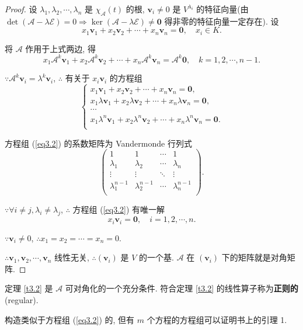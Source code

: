 \documentclass{ctexart}
\begin{document}
\begin{proof}
    设 $\lambda_1,\lambda_2,\cdots,\lambda_n$ 是 $\chi_{\mathcal{A}}(t)$ 的根, $\boldsymbol{v}_i\neq0$ 是 $V^{\lambda_i}$ 的特征向量(由 $\det(\mathcal{A}-\lambda\mathcal{E})=0\Rightarrow\ker(\mathcal{A}-\lambda\mathcal{E})\neq\boldsymbol{0}$ 得非零的特征向量一定存在). 设
    \[x_1\boldsymbol{v}_1+x_2\boldsymbol{v}_2+\cdots+x_n\boldsymbol{v}_n=\boldsymbol{0},\quad x_i\in K.\]
    
    将 $\mathcal{A}$ 作用于上式两边, 得
    \[x_1\mathcal{A}^k\boldsymbol{v}_1+x_2\mathcal{A}^k\boldsymbol{v}_2+\cdots+x_n\mathcal{A}^k\boldsymbol{v}_n=\mathcal{A}^k\boldsymbol{0},\quad k=1,2,\cdots,n-1.\]

    $\because\mathcal{A}^k\boldsymbol{v}_i=\lambda^k\boldsymbol{v}_i$, $\therefore$ 有关于 $x_i\boldsymbol{v}_i$ 的方程组
    \begin{equation}\label{eq3.2}
        \begin{cases}
            x_1\boldsymbol{v}_1+x_2\boldsymbol{v}_2+\cdots+x_n\boldsymbol{v}_n=\boldsymbol{0}, \\
            x_1\lambda\boldsymbol{v}_1+x_2\lambda\boldsymbol{v}_2+\cdots+x_n\lambda\boldsymbol{v}_n=\boldsymbol{0}, \\
            \cdots \\
            x_1\lambda^n\boldsymbol{v}_1+x_2\lambda^n\boldsymbol{v}_2+\cdots+x_n\lambda^n\boldsymbol{v}_n=\boldsymbol{0}. \\
        \end{cases}
    \end{equation}
    
    方程组 (\ref{eq3.2}) 的系数矩阵为 Vandermonde 行列式
    \[\begin{pmatrix}
        1 & 1 & \cdots & 1 \\
        \lambda_1 & \lambda_2 & \cdots & \lambda_n \\
        \vdots & \vdots & \ddots & \vdots \\
        \lambda^{n-1}_1 & \lambda^{n-1}_2 & \cdots & \lambda^{n-1}_n \\
    \end{pmatrix}.\]

    $\because\forall i\neq j,\lambda_i\neq\lambda_j$, $\therefore$ 方程组 (\ref{eq3.2}) 有唯一解
    \[x_i\boldsymbol{v}_i=\boldsymbol{0},\quad i=1,2,\cdots,n.\]

    $\because\boldsymbol{v}_i\neq0$, $\therefore x_1=x_2=\cdots=x_n=0$.

    $\therefore\boldsymbol{v}_1,\boldsymbol{v}_2,\cdots,\boldsymbol{v}_n$ 线性无关, $\therefore(\boldsymbol{v}_i)$ 是 $V$ 的一个基. $\mathcal{A}$ 在 $(\boldsymbol{v}_i)$ 下的矩阵就是对角矩阵.
\end{proof}
定理 \ref{t3.2} 是 $\mathcal{A}$ 可对角化的一个充分条件. 符合定理 \ref{t3.2} 的线性算子称为\textbf{正则的}(regular).
\begin{note}
    构造类似于方程组 (\ref{eq3.2}) 的, 但有 $m$ 个方程的方程组可以证明书上的引理 1.
\end{note}
\end{document}
